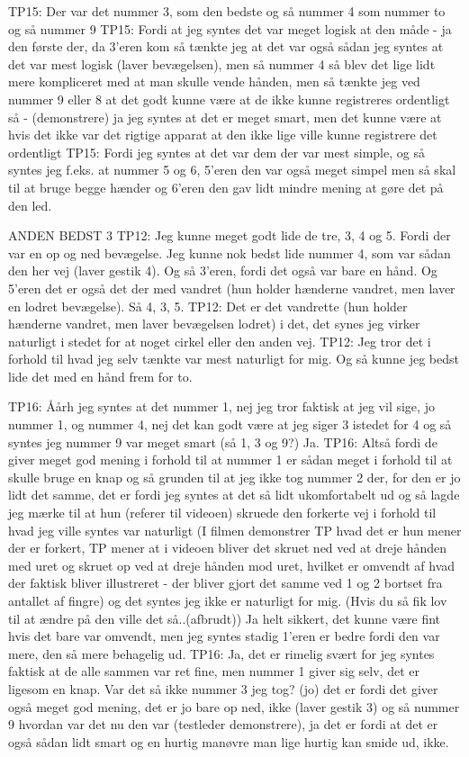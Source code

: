 TP15: Der var det nummer 3, som den bedste og så nummer 4 som nummer to og så nummer 9 
TP15: Fordi at jeg syntes det var meget logisk at den måde - ja den første der, da 3’eren kom så  tænkte jeg at det var også sådan jeg syntes at det var mest logisk (laver bevægelsen), men så nummer 4 så blev det lige lidt mere kompliceret med at man skulle vende hånden, men så tænkte jeg ved nummer 9 eller 8 at det godt kunne være at de ikke kunne registreres ordentligt så  - (demonstrere) ja jeg syntes at det er meget smart, men det kunne være at hvis det ikke var det rigtige apparat at den ikke lige ville kunne registrere det ordentligt 
TP15: Fordi jeg syntes at det var dem der var mest simple, og så syntes jeg f.eks. at nummer 5 og 6, 5’eren den var også meget simpel men så skal til at bruge begge hænder og 6’eren den gav lidt mindre mening at gøre det på den led. 

ANDEN BEDST 3
TP12: Jeg kunne meget godt lide de tre, 3, 4 og 5. Fordi der var en op og ned bevægelse. Jeg kunne nok bedst lide nummer 4, som var sådan den her vej (laver gestik 4). Og så 3’eren, fordi det også var bare en hånd. Og 5’eren det er også det der med vandret (hun holder hænderne vandret, men laver en lodret bevægelse). Så 4, 3, 5. 
TP12: Det er det vandrette (hun holder hænderne vandret, men laver bevægelsen lodret) i det, det synes jeg virker naturligt i stedet for at noget cirkel eller den anden vej. 
TP12: Jeg tror det i forhold til hvad jeg selv tænkte var mest naturligt for mig. Og så kunne jeg bedst lide det med en hånd frem for to. 

TP16: Åårh jeg syntes at det nummer 1, nej jeg tror faktisk at jeg vil sige, jo nummer 1, og nummer 4, nej det kan godt være at jeg siger 3 istedet for 4 og så syntes jeg nummer 9 var meget smart (så 1, 3 og 9?) Ja. 
TP16: Altså fordi de giver meget god mening i forhold til at nummer 1 er sådan meget i forhold til at skulle bruge en knap og så grunden til at jeg ikke tog nummer 2 der, for den er jo lidt det samme, det er fordi jeg syntes at det så lidt ukomfortabelt ud og så lagde jeg mærke til at hun (referer til videoen) skruede den forkerte vej i forhold til hvad jeg ville syntes var naturligt (I filmen demonstrer TP hvad det er hun mener der er forkert, TP mener at i videoen bliver det skruet ned ved at dreje hånden med uret og skruet op ved at dreje hånden mod uret, hvilket er omvendt af hvad der faktisk bliver illustreret - der bliver gjort det samme ved 1 og 2 bortset fra antallet af fingre) og det syntes jeg ikke er naturligt for mig. (Hvis du så fik lov til at ændre på den ville det så..(afbrudt)) Ja helt sikkert, det kunne være fint hvis det bare var omvendt, men jeg syntes stadig 1’eren er bedre fordi den var mere, den så mere behagelig ud.   
TP16: Ja, det er rimelig svært for jeg syntes faktisk at de alle sammen var ret fine, men nummer 1 giver sig selv, det er ligesom en knap. Var det så ikke nummer 3 jeg tog? (jo) det er fordi det giver også meget god mening, det er jo bare op ned, ikke (laver gestik 3) og så nummer 9 hvordan var det nu den var (testleder demonstrere), ja det er fordi at det er også sådan lidt smart og en hurtig manøvre man lige hurtig kan smide ud, ikke.



